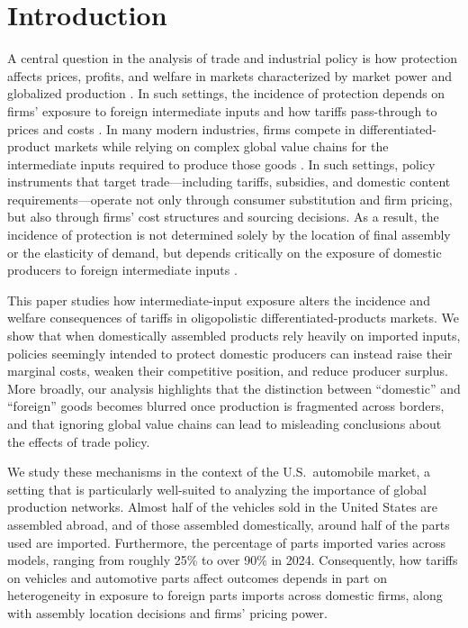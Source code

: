 \documentclass[11pt]{article}
\begin{document}
\newpage

\setcounter{page}{1}

\section{Introduction}\label{Section:sec_introduction}

A central question in the analysis of trade and industrial policy is how protection affects prices, profits, and welfare in markets characterized by market power and globalized production \citep{bagwell1999economic}. In such settings, the incidence of protection depends on firms' exposure to foreign intermediate inputs and how tariffs pass-through to prices and costs \citep{goldberg1996goods,amiti2019tariff}.
In many modern industries, firms compete in differentiated-product markets while relying on complex global value chains for the intermediate inputs required to produce those goods \citep{antras2004global}. In such settings, policy instruments that target trade---including tariffs, subsidies, and domestic content requirements---operate not only through consumer substitution and firm pricing, but also through firms’ cost structures and sourcing decisions. As a result, the incidence of protection is not determined solely by the location of final assembly or the elasticity of demand, but depends critically on the exposure of domestic producers to foreign intermediate inputs \citep{amiti2019tariff,barrot2016input}.

This paper studies how intermediate-input exposure alters the incidence and welfare consequences of tariffs in oligopolistic differentiated-products markets. We show that when domestically assembled products rely heavily on imported inputs, policies seemingly intended to protect domestic producers can instead raise their marginal costs, weaken their competitive position, and reduce producer surplus.
More broadly, our analysis highlights that the distinction between ``domestic'' and ``foreign'' goods becomes blurred once production is fragmented across borders, and that ignoring global value chains can lead to misleading conclusions about the effects of trade policy.

We study these mechanisms in the context of the U.S.\ automobile market, a setting that is particularly well-suited to analyzing the importance of global production networks.
Almost half of the vehicles sold in the United States are assembled abroad, and of those assembled domestically, around half of the parts used are imported. Furthermore, the percentage of parts imported varies across models, ranging from roughly 25\% to over 90\% in 2024. Consequently, how tariffs on vehicles and automotive parts affect outcomes depends in part on heterogeneity in exposure to foreign parts imports across domestic firms, along with assembly location decisions and firms' pricing power.
\end{document}
